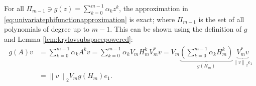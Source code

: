 \begin{corollary}
    \label{cor:univariateerrorestimationpolynomial}
    For all $\Pi_{m-1} \ni g(z) = \sum_{k=0}^{m-1}{\alpha_k} z^k$, the approximation in \eqref{eq:univariatephifunctionapproximation} is exact;
    where $\Pi_{m-1}$ is the set of all polynomials of degree up to $m-1$.
    This can be shown using the definition of $g$ and Lemma \ref{lem:krylovsubspacepowered}:
    \begin{equation*}
        \begin{aligned}
            g(A) v & = \sum_{k=0}^{m-1}{\alpha_k A^k v}
            = \sum_{k=0}^{m-1}{\alpha_k V_m H_m^k V_m^* v}
            = V_m \underset{g(H_m)}{\underbrace{\left( \sum_{k=0}^{m-1}{\alpha_k H_m^k } \right)}}
            \underset{\left\| v \right\|_2 e_1}{\underbrace{V_m^* v}}\\
            & = \left\| v \right\|_2 V_m g(H_m) e_1.
        \end{aligned}
    \end{equation*}
\end{corollary}

